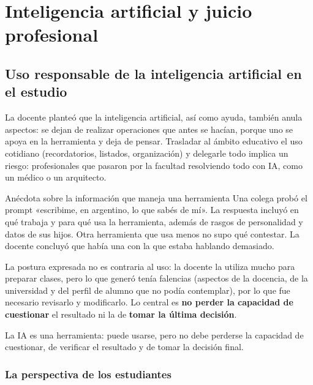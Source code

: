 \documentclass[12pt,oneside]{book}
\begin{document}
\chapter[IA y juicio profesional]{Inteligencia artificial y juicio profesional}

\section{Uso responsable de la inteligencia artificial en el estudio}

La docente planteó que la inteligencia artificial, así como ayuda, también anula aspectos: se dejan de realizar operaciones que antes se hacían, porque uno se apoya en la herramienta y deja de pensar. Trasladar al ámbito educativo el uso cotidiano (recordatorios, listados, organización) y delegarle todo implica un riesgo: profesionales que pasaron por la facultad resolviendo todo con IA, como un médico o un arquitecto.

\begin{example}{Anécdota sobre la información que maneja una herramienta}
Una colega probó el prompt «escribime, en argentino, lo que sabés de mí». La respuesta incluyó en qué trabaja y para qué usa la herramienta, además de rasgos de personalidad y datos de sus hijos. Otra herramienta que usa menos no supo qué contestar. La docente concluyó que había una con la que estaba hablando demasiado.
\end{example}

La postura expresada no es contraria al uso: la docente la utiliza mucho para preparar clases, pero lo que generó tenía falencias (aspectos de la docencia, de la universidad y del perfil de alumno que no podía contemplar), por lo que fue necesario revisarlo y modificarlo. Lo central es \textbf{no perder la capacidad de cuestionar} el resultado ni la de \textbf{tomar la última decisión}.

\begin{important}
La IA es una herramienta: puede usarse, pero no debe perderse la capacidad de cuestionar, de verificar el resultado y de tomar la decisión final.
\end{important}

\subsection{La perspectiva de los estudiantes}
\end{document}
